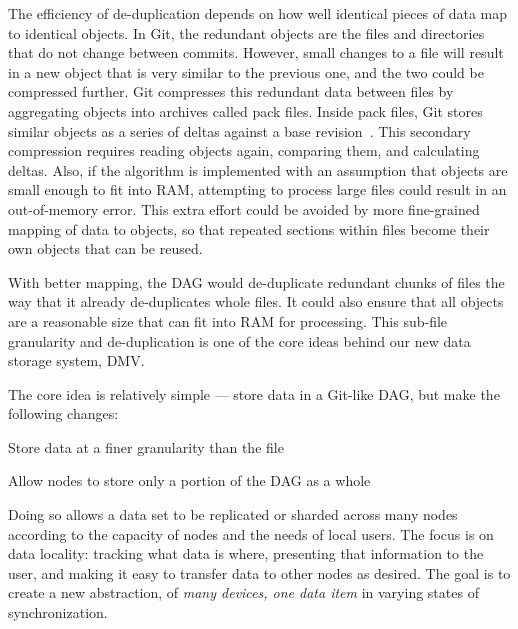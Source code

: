 The efficiency of de-duplication depends on how well identical pieces of data map to identical objects.
In Git, the redundant objects are the files and directories that do not change between commits.
However, small changes to a file will result in a new object that is very similar to the previous one, and the two could be compressed further.
Git compresses this redundant data between files by aggregating objects into archives called pack files.
Inside pack files, Git stores similar objects as a series of deltas against a base revision~\cite[Section 10.4]{git_book}.
This secondary compression requires reading objects again, comparing them, and calculating deltas.
Also, if the algorithm is implemented with an assumption that objects are small enough to fit into RAM, attempting to process large files could result in an out-of-memory error.
This extra effort could be avoided by more fine-grained mapping of data to objects, so that repeated sections within files become their own objects that can be reused.

With better mapping, the DAG would de-duplicate redundant chunks of files the way that it already de-duplicates whole files.
It could also ensure that all objects are a reasonable size that can fit into RAM for processing.
This sub-file granularity and de-duplication is one of the core ideas behind our new data storage system, \acrfull{DMV}.


%

The core idea is relatively simple --- store data in a Git-like \gls{DAG}, but make the following changes:

\begin{tight_enumerate}

    \item{Store data at a finer granularity than the file}

    \item{Allow nodes to store only a portion of the \gls{DAG} as a whole}

\end{tight_enumerate}

Doing so allows a data set to be replicated or sharded across many nodes according to the capacity of nodes and the needs of local users.
The focus is on data locality: tracking what data is where, presenting that information to the user, and making it easy to transfer data to other nodes as desired.
The goal is to create a new abstraction, of \emph{many devices, one data item} in varying states of synchronization.

